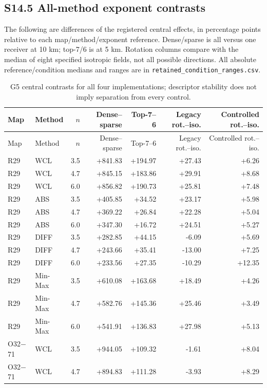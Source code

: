 \documentclass[journal,onecolumn,10pt]{IEEEtran}
\begin{document}
\subsection*{S14.5 All-method exponent contrasts}
The following are differences of the registered central effects, in percentage points relative to each map/method/exponent reference. Dense/sparse is all versus one receiver at 10 km; top-7/6 is at 5 km. Rotation columns compare with the median of eight specified isotropic fields, not all possible directions. All absolute reference/condition medians and ranges are in \texttt{retained\_condition\_ranges.csv}.
\begingroup\small
\begin{longtable}{@{}llrrrrr@{}}
\caption{G5 central contrasts for all four implementations; descriptor stability does not imply separation from every control.}\label{tab:s-g5full}\\
\toprule
Map & Method & $n$ & Dense--sparse & Top-7--6 & Legacy rot.--iso. & Controlled rot.--iso. \\
\midrule\endfirsthead
\toprule
Map & Method & $n$ & Dense--sparse & Top-7--6 & Legacy rot.--iso. & Controlled rot.--iso. \\
\midrule\endhead
\bottomrule\endfoot
R29 & WCL & 3.5 & +841.83 & +194.97 & +27.43 & +6.26 \\
R29 & WCL & 4.7 & +845.15 & +183.86 & +29.91 & +8.68 \\
R29 & WCL & 6.0 & +856.82 & +190.73 & +25.81 & +7.48 \\
R29 & ABS & 3.5 & +405.85 & +34.52 & +23.17 & +5.98 \\
R29 & ABS & 4.7 & +369.22 & +26.84 & +22.28 & +5.04 \\
R29 & ABS & 6.0 & +347.30 & +16.72 & +24.51 & +5.27 \\
R29 & DIFF & 3.5 & +282.85 & +44.15 & -6.09 & +5.69 \\
R29 & DIFF & 4.7 & +243.66 & +35.41 & -13.00 & +7.25 \\
R29 & DIFF & 6.0 & +233.56 & +27.35 & -10.29 & +12.35 \\
R29 & Min-Max & 3.5 & +610.08 & +163.68 & +18.49 & +4.26 \\
R29 & Min-Max & 4.7 & +582.76 & +145.36 & +25.46 & +3.49 \\
R29 & Min-Max & 6.0 & +541.91 & +136.83 & +27.98 & +5.13 \\
O32$-$71 & WCL & 3.5 & +944.05 & +109.32 & -1.61 & +8.04 \\
O32$-$71 & WCL & 4.7 & +894.83 & +111.28 & -3.93 & +8.29 \\

\end{longtable}
\end{document}
